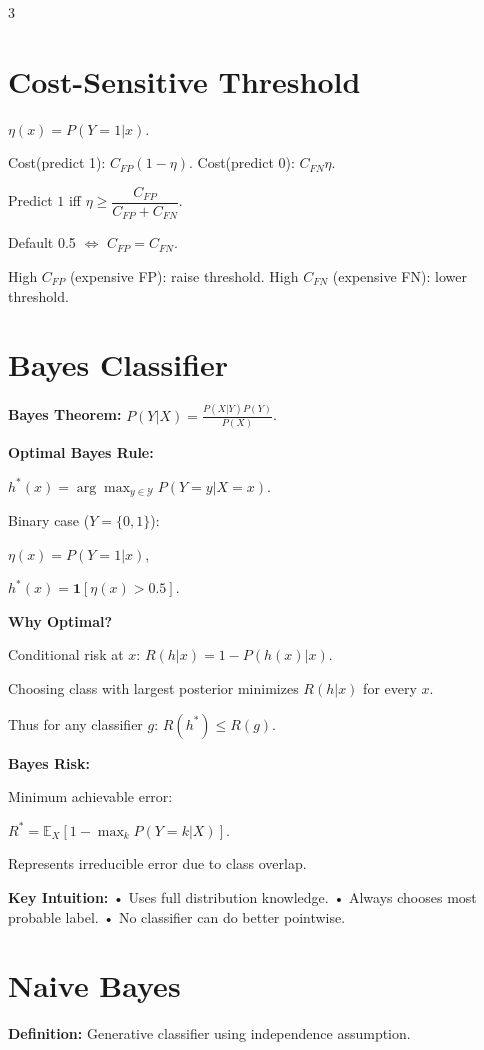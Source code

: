 \documentclass[8pt,fleqn]{extarticle}
\begin{document}
\begin{multicols}{3}
\section*{Cost-Sensitive Threshold}

$\eta(x)=P(Y=1|x)$.

Cost(predict 1): $C_{FP}(1-\eta)$.
Cost(predict 0): $C_{FN}\eta$.

Predict $1$ iff $\eta\ge\dfrac{C_{FP}}{C_{FP}+C_{FN}}$.

Default 0.5 $\iff$ $C_{FP}=C_{FN}$.

High $C_{FP}$ (expensive FP): raise threshold.
High $C_{FN}$ (expensive FN): lower threshold.


\section*{Bayes Classifier}

\textbf{Bayes Theorem:}
$P(Y|X)=\frac{P(X|Y)P(Y)}{P(X)}$.

\textbf{Optimal Bayes Rule:}

$h^*(x)=\arg\max_{y\in\mathcal Y} P(Y=y|X=x)$.

Binary case ($Y=\{0,1\}$):

$\eta(x)=P(Y=1|x)$,

$h^*(x)=\mathbf{1}[\eta(x)>0.5]$.

\textbf{Why Optimal?}

Conditional risk at $x$:
$R(h|x)=1-P(h(x)|x)$.

Choosing class with largest posterior
minimizes $R(h|x)$ for every $x$.

Thus for any classifier $g$:
$R(h^*)\le R(g)$.

\textbf{Bayes Risk:}

Minimum achievable error:

$R^*=\mathbb E_X[1-\max_k P(Y=k|X)]$.

Represents irreducible error due to class overlap.

\textbf{Key Intuition:}
• Uses full distribution knowledge.
• Always chooses most probable label.
• No classifier can do better pointwise.


\section*{Naive Bayes}

\textbf{Definition:}
Generative classifier using independence assumption.


\end{multicols}
\end{document}
